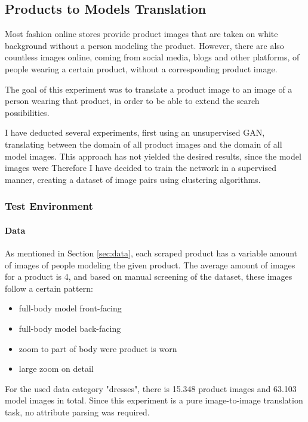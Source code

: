 \documentclass{article}
\begin{document}


\pagebreak
\subsection{Products to Models Translation}
Most fashion online stores provide product images that are taken on white background without a person modeling the product. However, there are also countless images online, coming from social media, blogs and other platforms, of people wearing a certain product, without a corresponding product image. 

The goal of this experiment was to translate a product image to an image of a person wearing that product, in order to be able to extend the search possibilities.

I have deducted several experiments, first using an unsupervised GAN, translating between the domain of all product images and the domain of all model images. This approach has not yielded the desired results, since the model images were  Therefore I have decided to train the network in a supervised manner, creating a dataset of image pairs using clustering algorithms.

\subsubsection{Test Environment}

\paragraph{Data}
As mentioned in Section \ref{sec:data}, each scraped product has a variable amount of images of people modeling the given product. The average amount of images for a product is 4, and based on manual screening of the dataset, these images follow a certain pattern:
\begin{itemize}
\item full-body model front-facing
\item full-body model back-facing
\item zoom to part of body were product is worn
\item large zoom on detail
\end{itemize}

For the used data category "dresses", there is 15.348 product images and 63.103 model images in total. Since this experiment is a pure image-to-image translation task, no attribute parsing was required. 
\end{document}
